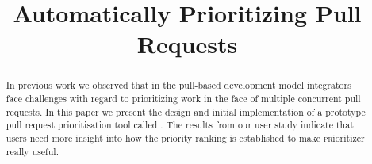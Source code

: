 \documentclass[conference]{IEEEtran}
\begin{document}
\newcommand{\ghtorrent}{\textsc{ght}orrent\xspace}
\newcommand{\prioritizer}{\textsc{pr}ioritizer\xspace}
\newcommand{\api}{\textsc{api}\xspace}
\newcommand{\todo}[1]{\textcolor{red}{\textbf{\textsc{todo:}} #1}}

\newcommand{\nb}[3]{
  \fcolorbox{black}{#2}{\bfseries\sffamily\scriptsize#1}
    {\sf\small$\blacktriangleright$\textit{#3}$\blacktriangleleft$}
}

\newcommand\georgios[1]{\nb{Georgios}{yellow}{#1}}
\newcommand\andy[1]{\nb{Andy}{cyan}{#1}}
\newcommand\erik[1]{\nb{Erik}{magenta}{#1}}

\newcommand{\hassanbox}[1]
{
  \vspace{0.29em}
  \noindent
  \fbox{
  \begin{minipage}{0.46\textwidth}
    \emph{\noindent #1}
    \end{minipage}
}}

\newcommand{\resp}[2]{{\sc R#1:} ``\emph{#2}''}
\newcommand{\respnum}[1]{{\sc R#1}}
\newcommand{\code}[1]{{\textsl{#1}}}

\title{Automatically Prioritizing Pull Requests}

\author{
}


\author{
\and
{}
\and
{}
}

\maketitle

\begin{abstract}
In previous work we observed that in the pull-based development model integrators face challenges with regard to prioritizing work in the face of multiple concurrent pull requests. In this paper we present the design and initial implementation of a prototype pull request prioritisation tool called \prioritzer . The results from our user study indicate that users need more insight into how the priority ranking is established to make \prioritizer really useful.
\end{abstract}
\end{document}
